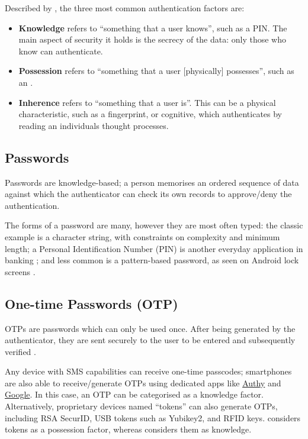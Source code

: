 Described by \cite{surveyOnAuthFactors}, the three most
common authentication factors are: 

\begin{itemize} 

  \item \textbf{Knowledge} \label{p:knowledge} refers to
        \enquote{something that a user knows}, such as a PIN.
        The main aspect of security it holds is the secrecy of the
        data: only those who know can authenticate.

  \item \textbf{Possession} refers to \enquote{something
          that a user [physically] possesses}, such as an
        .

  \item \textbf{Inherence} refers to \enquote{something
          that a user is}.
        This can be a physical characteristic, such as a
        fingerprint, or cognitive, which authenticates by reading
        an individuals thought processes.
\end{itemize}

\subsection{Passwords}
\label{p:passwords}
Passwords are knowledge-based; a person memorises an
ordered sequence of data against which the authenticator
can check its own records to approve/deny the
authentication.

The forms of a password are many, however they are most
often typed: the classic example is a character string,
with  constraints on complexity and minimum length; a
Personal Identification Number (PIN) is another everyday
application in banking \parencite{whatIsAuth}; and less
common is a pattern-based password, as seen on Android lock
screens \parencite{androidLockScreen}.

\subsection{One-time Passwords (OTP)}
\label{p:otp}
OTPs are passwords which can only be used once.
After being generated by the authenticator, they are sent
securely to the user to be entered and subsequently
verified \parencite{surveyOnAuthFactors}.

Any device with SMS capabilities can receive one-time
passcodes; smartphones are also able to receive/generate
OTPs using dedicated apps like
\href{https://www.twilio.com/authy/features/totp}{Authy}
and \href{https://play.google.com/store/apps/details?
  id=com.google.android.apps.authenticator2}{Google}.
In this case, an OTP can be categorised as a knowledge
factor\parencite{surveyOnAuthFactors, evalOfAuthMethods}.
Alternatively, proprietary devices named \enquote{tokens}
can also generate OTPs, including RSA SecurID, USB tokens
such as Yubikey2, and RFID keys.
\cite{evalOfAuthMethods} considers tokens
as a possession factor, whereas
\cite{surveyOnAuthFactors} considers them as
knowledge.

